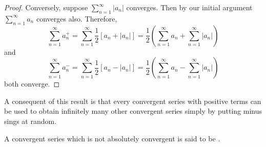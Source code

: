 \begin{proof}
    Conversely, suppose $\sum\limits_{n=1}^{\infty}|a_n|$ converges. Then by our initial argument $\sum\limits_{n=1}^{\infty}a_n$ converges also. Therefore, \begin{equation*}
        \sum\limits_{n=1}^{\infty}a_n^+ = \sum\limits_{n=1}^{\infty}\frac{1}{2}[a_n + |a_n|] = \frac{1}{2}\left(\sum\limits_{n=1}^{\infty}a_n + \sum\limits_{n=1}^{\infty}|a_n|\right)
    \end{equation*}
    and  \begin{equation*}
        \sum\limits_{n=1}^{\infty}a_n^- = \sum\limits_{n=1}^{\infty}\frac{1}{2}[a_n - |a_n|] = \frac{1}{2}\left(\sum\limits_{n=1}^{\infty}a_n - \sum\limits_{n=1}^{\infty}|a_n|\right)
    \end{equation*}
    both converge.
\end{proof}



\begin{rmk}
    A consequent of this result is that every convergent series with positive terms can be used to obtain infinitely many other convergent series simply by putting minus sings at random.
\end{rmk}

\begin{defn}
    A convergent series which is not absolutely convergent is said to be .
\end{defn}


